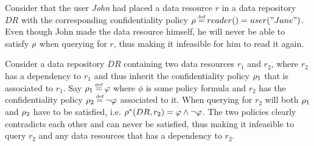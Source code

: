 \begin{example}
Consider that the user \emph{John} had placed a data resource $r$ in a data repository $DR$ with the corresponding confidentiality policy $\conf \eqdef reader() = user("Jane")$. Even though John made the data resource himself, he will never be able to satisfy $\rho$ when querying for $r$, thus making it infeasible for him to read it again.
\end{example}

\begin{example}
Consider a data repository $DR$ containing two data resources $r_1$ and $r_2$, where $r_2$ has a dependency to $r_1$ and thus inherit the confidentiality policy $\rho_1$ that is associated to $r_1$. Say $\conf_1 \eqdef \phi$ where $\phi$ is some policy formula and $r_2$ has the confidentiality policy $\conf_2 \eqdef \lnot \phi$ associated to it. When querying for $r_2$ will both $\rho_1$ and $\rho_2$ have to be satisfied, i.e. $\rho^{\ast}(DR,r_2) = \varphi \land \lnot \varphi$. The two policies clearly contradicts each other and can never be satisfied, thus making it infeasible to query $r_2$ and any data resources that has a dependency to $r_2$.
\end{example}

